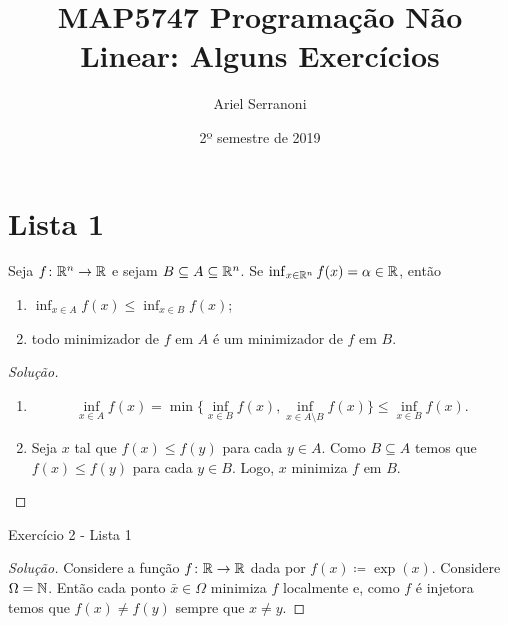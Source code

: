 \documentclass[12pt,twoside,a4paper]{article}
\title{MAP5747 Programação Não Linear: Alguns Exercícios}
\author{Ariel Serranoni}
\date{2º semestre de 2019}
\begin{document}
\maketitle
\tableofcontents
\section{Lista 1}
\begin{problema}
  Seja \(f\colon\mathbb{R}^n\to\mathbb{R}\) e sejam
  \(B\subseteq A\subseteq\mathbb{R}^n\). Se
 \(\inf_{x\in\mathbb{R}^n}f(x)=\alpha\in\mathbb{R}\), então
\begin{enumerate}[label=(\roman*)]
\item \(\inf_{x\in A}f(x)\leq\inf_{x\in B}f(x)\);
\item todo minimizador de \(f\) em \(A\) é um minimizador de \(f\)
  em \(B\).
\end{enumerate}
\end{problema}
\begin{proof}[Solução]\hfill
  \begin{enumerate}[label=(\roman*)]
  \item \[\inf_{x\in A} f(x)=
      \min\{\inf_{x\in B}f(x), \inf_{x\in A\setminus B}f(x)\}\leq
      \inf_{x\in B}f(x).\]
  \item Seja \(x\) tal que \(f(x)\leq f(y)\) para cada \(y\in A\). Como
    \(B\subseteq A\) temos que \(f(x)\leq f(y)\) para cada \(y\in B\).
    Logo,
    \(x\) minimiza \(f\) em \(B\).\qedhere
    \end{enumerate}
\end{proof}

\begin{problema}
Exercício 2 - Lista 1
\end{problema}
\begin{proof}[Solução]
  Considere a função \(f\colon\mathbb{R}\to\mathbb{R}\) dada por
  \(f(x)\coloneqq\exp(x)\). Considere \(\Omega=\mathbb{N}\).
  Então cada ponto \(\bar{x}\in\Omega\) minimiza \(f\) localmente e,
  como \(f\) é injetora temos que \(f(x)\not=f(y)\)
  sempre que \(x\not= y\).\qedhere
\end{proof}
\end{document}
